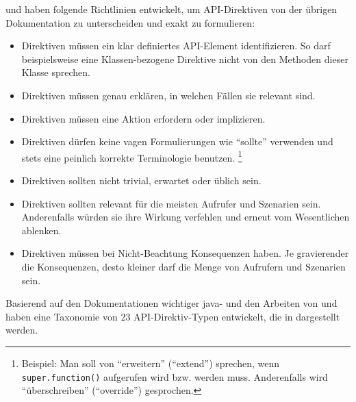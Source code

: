 \begin{important}
\cite{dekel2011increasing} und \cite{Monperrus:2011bf} haben folgende Richtlinien entwickelt, um API-Direktiven von der übrigen Dokumentation zu unterscheiden und exakt zu formulieren:
\begin{itemize}
\item Direktiven müssen ein klar definiertes API-Element identifizieren. So darf beispielsweise eine Klassen-bezogene Direktive nicht von den Methoden dieser Klasse sprechen. \citep{Monperrus:2011bf}
\item Direktiven müssen genau erklären, in welchen Fällen sie relevant sind. \citep{Monperrus:2011bf}
\item Direktiven müssen eine Aktion erfordern oder implizieren. \citep{dekel2011increasing}
\item Direktiven dürfen keine vagen Formulierungen wie ``sollte'' verwenden und stets eine peinlich korrekte Terminologie benutzen. \footnote{Beispiel: Man soll von ``erweitern'' (``extend'') sprechen, wenn \texttt{super.function()} aufgerufen wird bzw. werden muss. Anderenfalls wird ``überschreiben'' (``override'') gesprochen.} \citep{Monperrus:2011bf}
\item Direktiven sollten nicht trivial, erwartet oder üblich sein. \citep{dekel2011increasing}
\item Direktiven sollten relevant für die meisten Aufrufer und Szenarien sein. Anderenfalls würden sie ihre Wirkung verfehlen und erneut vom Wesentlichen ablenken. \citep{dekel2011increasing}
\item Direktiven müssen bei Nicht-Beachtung Konsequenzen haben. Je gravierender die Konsequenzen, desto kleiner darf die Menge von Aufrufern und Szenarien sein. \citep{dekel2011increasing}
\end{itemize}

Basierend auf den Dokumentationen wichtiger \gls{java}- und den Arbeiten von \cite{dekel2011increasing} und \cite{Bruch:il} haben \cite{Monperrus:2011bf} eine Taxonomie von 23 API-Direktiv-Typen entwickelt, die in  dargestellt werden.
\end{important}


